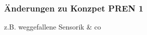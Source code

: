 \documentclass[main.tex]{subfiles} %
\begin{document}

\subsubsection{Änderungen zu Konzpet PREN 1}

z.B. weggefallene Sensorik \& co
\end{document}
